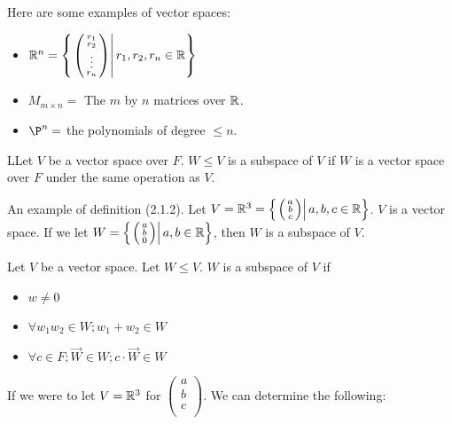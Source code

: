   Here are some examples of vector spaces:

  \begin{itemize}
    \item $\mathbb{R}^n=\left\{\left.\left(\begin{smallmatrix}r_1\\r_2\\\vdots\\r_n\end{smallmatrix}\right)\right|r_1,r_2,r_n\in\mathbb{R}\right\}$
    \item $M_{m\times n}=$ The $m$ by $n$ matrices over $\mathbb{R}$.
    \item $\P^n=$ the polynomials of degree $\le n$.
  \end{itemize}

  \begin{definition}
    LLet $V$ be a vector space over $F$. $W\le V$ is a subspace of $V$ if $W$ is a vector space over $F$ under the same operation as $V$.
  \end{definition}

  An example of definition (2.1.2). Let $V=\mathbb{R}^3=\left\{\left.\left(\begin{smallmatrix}a\\b\\c\end{smallmatrix}\right)\right|a,b,c\in\mathbb{R}\right\}$. $V$ is a vector space. If we let $W=\left\{\left.\left(\begin{smallmatrix}a\\b\\0\\\end{smallmatrix}\right)\right|a,b\in\mathbb{R}\right\}$, then $W$ is a subspace of $V$.

  \begin{theorem}
    Let $V$ be a vector space. Let $W\le V$. $W$ is a subspace of $V$ if 
    \begin{itemize}
      \item $w\neq0$
      \item $\forall w_1w_2\in W;w_1+w_2\in W$
      \item $\forall c\in F;\vec{W}\in W;c\cdot\vec{W}\in W$
    \end{itemize}
  \end{theorem}

  If we were to let $V=\mathbb{R}^3$ for $\left(\begin{smallmatrix}a\\b\\c\\\end{smallmatrix}\right)$. We can determine the following:

